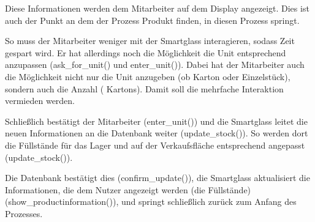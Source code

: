 Diese Informationen werden dem Mitarbeiter auf dem Display angezeigt. Dies ist auch der Punkt an dem der Prozess \glqq Produkt finden\grqq , in diesen Prozess springt.

So muss der Mitarbeiter weniger mit der Smartglass interagieren, sodass Zeit gespart wird. Er hat allerdings noch die Möglichkeit die Unit entsprechend anzupassen (ask\_for\_unit() und enter\_unit()). Dabei hat der Mitarbeiter auch die Möglichkeit nicht nur die Unit anzugeben (ob Karton oder Einzelstück), sondern auch die Anzahl ( Kartons). Damit soll die mehrfache Interaktion vermieden werden. 

Schließlich bestätigt der Mitarbeiter (enter\_unit()) und die Smartglass leitet die neuen Informationen an die Datenbank weiter (update\_stock()). So werden dort die Füllstände für das Lager und auf der Verkaufsfläche entsprechend angepasst (update\_stock()).

Die Datenbank bestätigt dies (confirm\_update()), die Smartglass aktualisiert die Informationen, die dem Nutzer angezeigt werden (die Füllstände) (show\_productinformation()), und springt schließlich zurück zum Anfang des Prozesses. 



